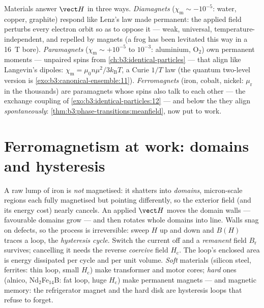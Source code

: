 \begin{remark}\label{rem:b3:electromagnetism-in-matter:zoo}
Materials answer $\vect H$ in three ways.
\emph{Diamagnets} ($\chi_{\text{m}} \sim -10^{-5}$: water, copper,
graphite) respond like Lenz's law made permanent: the applied field
perturbs every electron orbit so as to oppose it --- weak, universal,
temperature-independent, and repelled by magnets (a frog has been
levitated this way in a \qty{16}{T} bore).
\emph{Paramagnets} ($\chi_{\text{m}} \sim +10^{-5}$ to $10^{-3}$:
aluminium, O$_2$) own permanent moments --- unpaired spins from
\cref{ch:b3:identical-particles} --- that align like Langevin's
dipoles: $\chi_{\text{m}} = \mu_0 n\mu^2/3k_{\text{B}}T$, a Curie
$1/T$ law (the quantum two-level version is
\cref{exo:b3:canonical-ensemble:11}).
\emph{Ferromagnets} (iron, cobalt, nickel: $\mu_{\text{r}}$ in the
thousands) are paramagnets whose spins also talk to each other ---
the exchange coupling of \cref{exo:b3:identical-particles:12} ---
and below the  they align \emph{spontaneously}:
\cref{thm:b3:phase-transitions:meanfield}, now put to work.
\end{remark}

\section{Ferromagnetism at work: domains and hysteresis}

\begin{definition}\label{def:b3:electromagnetism-in-matter:hysteresis}
A raw lump of iron is \emph{not} magnetised: it shatters into
\emph{domains}, micron-scale regions each fully magnetised but
pointing differently, so the exterior field (and its energy cost)
nearly cancels. An applied $\vect H$ moves the domain walls ---
favourable domains grow --- and then rotates whole domains into
line. Walls snag on defects, so the process is irreversible: sweep
$H$ up and down and $B(H)$ traces a loop, the \emph{hysteresis
cycle}. Switch the current off and a \emph{remanent} field
$B_{\text{r}}$ survives; cancelling it needs the reverse
\emph{coercive} field $H_{\text{c}}$. The loop's enclosed area is
energy dissipated per cycle and per unit volume. \emph{Soft}
materials (silicon steel, ferrites: thin loop, small
$H_{\text{c}}$) make transformer and motor cores; \emph{hard} ones
(alnico, Nd$_2$Fe$_{14}$B: fat loop, huge $H_{\text{c}}$) make
permanent magnets --- and magnetic memory: the refrigerator magnet
and the hard disk are hysteresis loops that refuse to forget.
\end{definition}

